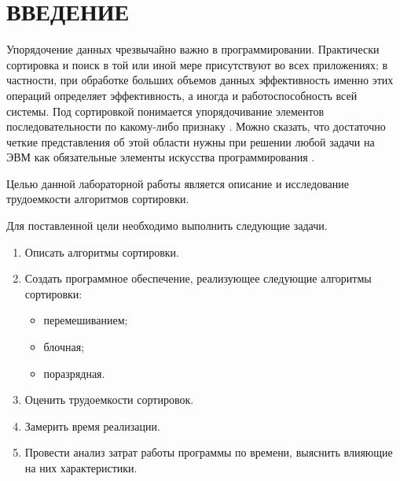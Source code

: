 \chapter*{\hfill{\centering  ВВЕДЕНИЕ}\hfill}


Упорядочение данных чрезвычайно важно в программировании. Практически сортировка и поиск в той или иной
мере присутствуют во всех приложениях; в частности, при обработке больших объемов данных эффективность именно этих операций определяет эффективность, а иногда и работоспособность всей системы.
Под сортировкой понимается упорядочивание элементов последовательности по какому-либо признаку \cite{book_shagbazyan}.
Можно сказать, что достаточно четкие представления об этой области нужны при решении любой задачи на ЭВМ как
обязательные элементы искусства программирования \cite{book_knut}.


Целью данной лабораторной работы является описание и исследование трудоемкости алгоритмов сортировки.

\label{sec:targets}
Для поставленной цели необходимо выполнить следующие задачи.
\begin{enumerate}
	\item Описать алгоритмы сортировки.
	\item Создать программное обеспечение, реализующее следующие алгоритмы сортировки:
	\begin{itemize}
		\item перемешиванием;
		\item блочная;
		\item поразрядная.
	\end{itemize}
	\item Оценить трудоемкости сортировок.
	\item Замерить время реализации.
	\item Провести анализ затрат работы программы по времени, выяснить влияющие на них характеристики.
\end{enumerate}




